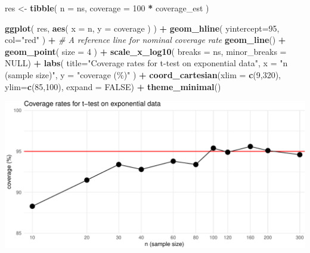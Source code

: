 \documentclass[
]{book}
\newenvironment{Shaded}{\begin{snugshade}}{\end{snugshade}}
\newcommand{\AttributeTok}[1]{\textcolor[rgb]{0.13,0.29,0.53}{#1}}
\newcommand{\CommentTok}[1]{\textcolor[rgb]{0.56,0.35,0.01}{\textit{#1}}}
\newcommand{\ConstantTok}[1]{\textcolor[rgb]{0.56,0.35,0.01}{#1}}
\newcommand{\DecValTok}[1]{\textcolor[rgb]{0.00,0.00,0.81}{#1}}
\newcommand{\FunctionTok}[1]{\textcolor[rgb]{0.13,0.29,0.53}{\textbf{#1}}}
\newcommand{\NormalTok}[1]{#1}
\newcommand{\OtherTok}[1]{\textcolor[rgb]{0.56,0.35,0.01}{#1}}
\newcommand{\SpecialCharTok}[1]{\textcolor[rgb]{0.81,0.36,0.00}{\textbf{#1}}}
\newcommand{\StringTok}[1]{\textcolor[rgb]{0.31,0.60,0.02}{#1}}
\begin{document}
\begin{Shaded}
\begin{Highlighting}[]
\NormalTok{res }\OtherTok{\textless{}{-}} \FunctionTok{tibble}\NormalTok{( }
  \AttributeTok{n =}\NormalTok{ ns, }
  \AttributeTok{coverage =} \DecValTok{100} \SpecialCharTok{*}\NormalTok{ coverage\_est }
\NormalTok{)}

\FunctionTok{ggplot}\NormalTok{( res, }\FunctionTok{aes}\NormalTok{( }\AttributeTok{x =}\NormalTok{ n, }\AttributeTok{y =}\NormalTok{ coverage ) ) }\SpecialCharTok{+}
  \FunctionTok{geom\_hline}\NormalTok{( }\AttributeTok{yintercept=}\DecValTok{95}\NormalTok{, }\AttributeTok{col=}\StringTok{"red"}\NormalTok{ ) }\SpecialCharTok{+}  
  \CommentTok{\# A reference line for nominal coverage rate}
  \FunctionTok{geom\_line}\NormalTok{() }\SpecialCharTok{+} 
  \FunctionTok{geom\_point}\NormalTok{( }\AttributeTok{size =} \DecValTok{4}\NormalTok{ ) }\SpecialCharTok{+}
  \FunctionTok{scale\_x\_log10}\NormalTok{( }\AttributeTok{breaks =}\NormalTok{ ns, }\AttributeTok{minor\_breaks =} \ConstantTok{NULL}\NormalTok{) }\SpecialCharTok{+}
  \FunctionTok{labs}\NormalTok{( }
    \AttributeTok{title=}\StringTok{"Coverage rates for t{-}test on exponential data"}\NormalTok{,}
    \AttributeTok{x =} \StringTok{"n (sample size)"}\NormalTok{, }
    \AttributeTok{y =} \StringTok{"coverage (\%)"} 
\NormalTok{  ) }\SpecialCharTok{+}
  \FunctionTok{coord\_cartesian}\NormalTok{(}\AttributeTok{xlim =} \FunctionTok{c}\NormalTok{(}\DecValTok{9}\NormalTok{,}\DecValTok{320}\NormalTok{), }\AttributeTok{ylim=}\FunctionTok{c}\NormalTok{(}\DecValTok{85}\NormalTok{,}\DecValTok{100}\NormalTok{), }\AttributeTok{expand =} \ConstantTok{FALSE}\NormalTok{) }\SpecialCharTok{+} 
  \FunctionTok{theme\_minimal}\NormalTok{()}
\end{Highlighting}
\end{Shaded}

\begin{center}\includegraphics[width=0.75\linewidth]{Designing-Simulations-in-R_files/figure-latex/ttest_result_figure-1} \end{center}
\end{document}
